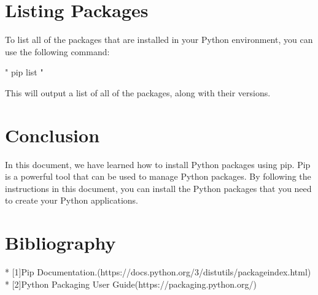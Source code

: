 \documentclass[10pt]{report}
\begin{document}
\section{Listing Packages}

To list all of the packages that are installed in your Python environment, you can use the following command:

"
pip list
"

This will output a list of all of the packages, along with their versions.

\section{Conclusion}

In this document, we have learned how to install Python packages using pip. Pip is a powerful tool that can be used to manage Python packages. By following the instructions in this document, you can install the Python packages that you need to create your Python applications.

\section{Bibliography}
* [1]Pip Documentation.(https://docs.python.org/3/distutils/packageindex.html)\\
* [2]Python Packaging User Guide(https://packaging.python.org/)
\end{document}
